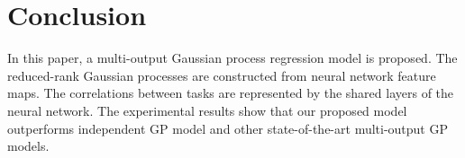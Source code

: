 \section{Conclusion}\label{sec:conclusion}

In this paper, a multi-output Gaussian process regression model is proposed. The reduced-rank Gaussian processes are constructed from neural network feature maps. The correlations between tasks are represented by the shared layers of the neural network. The experimental results show that our proposed model outperforms independent GP model and other state-of-the-art multi-output GP models.


